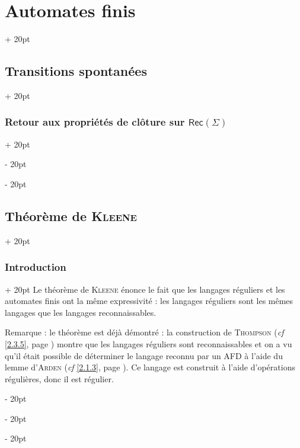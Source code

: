 \documentclass[a4paper, 12pt, twoside]{article}
\newcommand{\lr}[1]{\left( #1 \right)}
\newcommand{\ind}[1][20pt]{\advance\leftskip + #1}
\newcommand{\deind}[1][20pt]{\advance\leftskip - #1}
\newenvironment{indt}[2][20pt]{#2 \par \ind[#1]}{\par \deind} %
\newcommand{\Rec}[1]{\mathsf{Rec}\!\lr{#1}}
\begin{document}
\begin{indt}{\section{Automates finis}}
\begin{indt}{\subsection{Transitions spontanées}}
\begin{indt}{\subsubsection{Retour aux propriétés de clôture sur $\Rec \Sigma$}}
\begin{center}
                \end{center}
            \end{indt}
        \end{indt}

        \vspace{12pt}
        
        \begin{indt}{\subsection{Théorème de \textsc{Kleene}}}
            \begin{indt}{\subsubsection{Introduction}}
                Le théorème de \textsc{Kleene} énonce le fait que les langages réguliers et les automates finis ont la même expressivité : les langages réguliers sont les mêmes langages que les langages reconnaissables.

                \vspace{12pt}
                
                Remarque : le théorème est déjà démontré : la construction de \textsc{Thompson} (\textit{cf} \ref{2.3.5}, page \pageref{2.3.5}) montre que les langages réguliers sont reconnaissables et on a vu qu'il était possible de déterminer le langage reconnu par un AFD à l'aide du lemme d'\textsc{Arden} (\textit{cf} \ref{2.1.3}, page \pageref{2.1.3}).
                Ce langage est construit à l'aide d'opérations régulières, donc il est régulier.


\end{indt}
\end{indt}
\end{indt}
\end{document}

